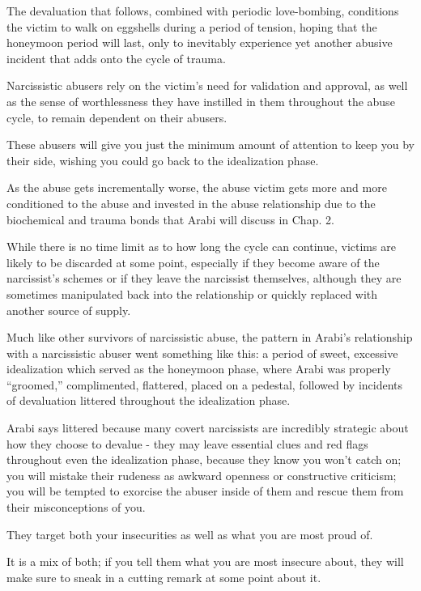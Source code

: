 \documentclass[oneside]{book}
\numberwithin{equation}{section}
\begin{document}
%
The devaluation that follows, combined with periodic love-bombing, conditions the victim to walk on eggshells during a period of tension, hoping that the honeymoon period will last, only to inevitably experience yet another abusive incident that adds onto the cycle of trauma.

Narcissistic abusers rely on the victim's need for validation and approval, as well as the sense of worthlessness they have instilled in them throughout the abuse cycle, to remain dependent on their abusers.

%
These abusers will give you just the minimum amount of attention to keep you by their side, wishing you could go back to the idealization phase.

As the abuse gets incrementally worse, the abuse victim gets more and more conditioned to the abuse and invested in the abuse relationship due to the biochemical and trauma bonds that Arabi will discuss in Chap. 2.

%
While there is no time limit as to how long the cycle can continue, victims are likely to be discarded at some point, especially if they become aware of the narcissist's schemes or if they leave the narcissist themselves, although they are sometimes manipulated back into the relationship or quickly replaced with another source of supply.

%
Much like other survivors of narcissistic abuse, the pattern in Arabi's relationship with a narcissistic abuser went something like this: a period of sweet, excessive idealization which served as the honeymoon phase, where Arabi was properly ``groomed,'' complimented, flattered, placed on a pedestal, followed by incidents of devaluation littered throughout the idealization phase.

Arabi says littered because many covert narcissists are incredibly strategic about how they choose to devalue - they may leave essential clues and red flags throughout even the idealization phase, because they know you won't catch on; you will mistake their rudeness as awkward openness or constructive criticism; you will be tempted to exorcise the abuser inside of them and rescue them from their misconceptions of you.

%

They target both your insecurities as well as what you are most proud of.

It is a mix of both; if you tell them what you are most insecure about, they will make sure to sneak in a cutting remark at some point about it.
\end{document}
